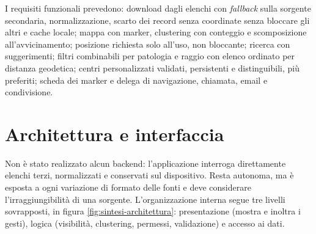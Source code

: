 \documentclass[a4paper, oneside, openright]{book}
\begin{document}
I requisiti funzionali prevedono: download dagli elenchi con
\textit{fallback} sulla sorgente secondaria, normalizzazione, scarto dei
record senza coordinate senza bloccare gli altri e cache locale;
mappa con marker, clustering con conteggio e scomposizione
all'avvicinamento; posizione richiesta solo all'uso, non bloccante;
ricerca con suggerimenti; %
filtri combinabili per patologia e raggio con elenco ordinato per distanza
geodetica; centri personalizzati validati, persistenti e distinguibili, pi\`u
preferiti; scheda dei marker e delega di navigazione, chiamata, email e
condivisione.

\section{Architettura e interfaccia}\label{sec:sintesi-architettura}

Non \`e stato realizzato alcun backend: l'applicazione interroga
direttamente elenchi terzi, normalizzati e conservati sul dispositivo.
Resta autonoma, ma \`e esposta a ogni
variazione di formato delle fonti e deve considerare l'irraggiungibilit\`a di una
sorgente.
L'organizzazione interna segue tre livelli sovrapposti, in figura
\ref{fig:sintesi-architettura}: presentazione (mostra e inoltra i gesti),
logica (visibilit\`a, clustering, permessi, validazione) e accesso ai dati.
\end{document}
